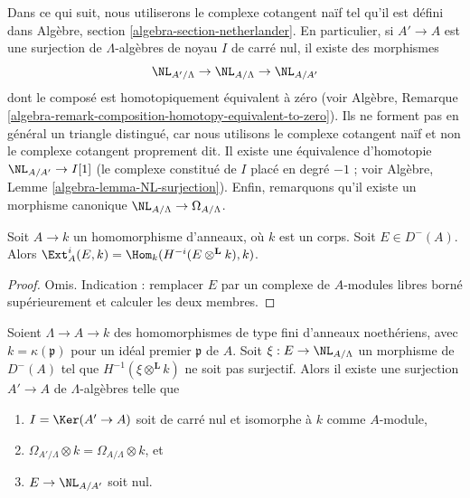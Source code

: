 \medskip\noindent
Dans ce qui suit, nous utiliserons le complexe cotangent naïf tel qu'il est
défini dans Algèbre, section \ref{algebra-section-netherlander}.
En particulier, si $A' \to A$ est une surjection de $\Lambda$-algèbres
de noyau $I$ de carré nul, il existe des morphismes
$$
\NL_{A'/\Lambda} \to \NL_{A/\Lambda} \to \NL_{A/A'}
$$
dont le composé est homotopiquement équivalent à zéro (voir
Algèbre, Remarque \ref{algebra-remark-composition-homotopy-equivalent-to-zero}).
Ils ne forment pas en général un triangle distingué, car nous utilisons
le complexe cotangent naïf et non le complexe cotangent proprement dit.
Il existe une équivalence d'homotopie $\NL_{A/A'} \to I[1]$ (le complexe
constitué de $I$ placé en degré $-1$ ; voir
Algèbre, Lemme \ref{algebra-lemma-NL-surjection}).
Enfin, remarquons qu'il existe un morphisme canonique
$\NL_{A/\Lambda} \to \Omega_{A/\Lambda}$.

\begin{lemma}
\label{lemma-compute-ext-into-field}
Soit $A \to k$ un homomorphisme d'anneaux, où $k$ est un corps. Soit $E \in D^-(A)$.
Alors $\Ext^i_A(E, k) = \Hom_k(H^{-i}(E \otimes^\mathbf{L} k), k)$.
\end{lemma}

\begin{proof}
Omis. Indication : remplacer $E$ par un complexe de $A$-modules libres borné
supérieurement et calculer les deux membres.
\end{proof}

\begin{lemma}
\label{lemma-construct-essential-surjection}
Soient $\Lambda \to A \to k$ des homomorphismes de type fini d'anneaux noethériens,
avec $k = \kappa(\mathfrak p)$ pour un idéal premier $\mathfrak p$ de $A$. Soit
$\xi : E \to \NL_{A/\Lambda}$ un morphisme de $D^{-}(A)$ tel que
$H^{-1}(\xi \otimes^{\mathbf{L}} k)$ ne soit pas surjectif.
Alors il existe une surjection $A' \to A$ de $\Lambda$-algèbres
telle que
\begin{enumerate}
\item[(a)] $I = \Ker(A' \to A)$ soit de carré nul et isomorphe à $k$
comme $A$-module,
\item[(b)] $\Omega_{A'/\Lambda} \otimes k = \Omega_{A/\Lambda} \otimes k$, et
\item[(c)] $E \to \NL_{A/A'}$ soit nul.
\end{enumerate}
\end{lemma}


